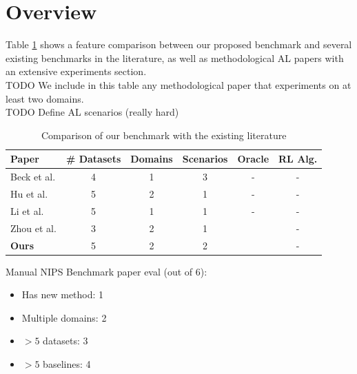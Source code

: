 \documentclass[]{article}
\begin{document}
\section{Overview}
Table \ref{tab:benchmark_comparison} shows a feature comparison between our proposed benchmark and several existing benchmarks in the literature, as well as methodological AL papers with an extensive experiments section. \\
{\color{red} TODO} We include in this table any methodological paper that experiments on at least two domains. \\
{\color{red} TODO} Define AL scenarios (really hard)
\begin{table}[h]
	\centering
	\begin{tabular}{l | c c c c c}
		Paper & \# Datasets & Domains & Scenarios & Oracle & RL Alg. \\
		\hline
		Beck et al. \cite{beck2021effective} & 4 & 1 & 3 & - & - \\
		Hu et al. \cite{hu2021towards} & 5 & 2 & 1 & - & - \\
		Li et al. \cite{li2022empirical} & 5 & 1 & 1 & - & - \\
		Zhou et al. \cite{zhou2021towards} & 3 & 2 & 1 & \checkmark & - \\
		\textbf{Ours} & 5 & 2 & 2 & \checkmark & -
	\end{tabular}
	\caption{Comparison of our benchmark with the existing literature}
	\label{tab:benchmark_comparison}
\end{table}

Manual NIPS Benchmark paper eval (out of 6):
\begin{itemize}
	\item Has new method: 1
	\item Multiple domains: 2
	\item $> 5$ datasets: 3
	\item $> 5$ baselines: 4
\end{itemize}


\end{document}

